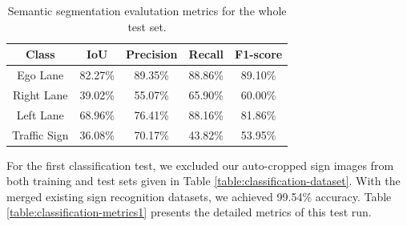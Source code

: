 \begin{table}[h]
  \begin{center}
    \caption{Semantic segmentation evalutation metrics for the whole test set.}
    \label{table:segmentation-metrics2}
    \begin{tabular}{|c|c|c|c|c|}
      \hline
      \textbf{Class} & \textbf{IoU} & \textbf{Precision} & \textbf{Recall} & \textbf{F1-score} \\
      \hline
      Ego Lane       & 82.27\%      & 89.35\%            & 88.86\%         & 89.10\% \\ 
      \hline
      Right Lane     & 39.02\%      & 55.07\%            & 65.90\%         & 60.00\% \\ 
      \hline
      Left Lane      & 68.96\%      & 76.41\%            & 88.16\%         & 81.86\% \\ 
      \hline
      Traffic Sign   & 36.08\%      & 70.17\%            & 43.82\%         & 53.95\% \\
      \hline
    \end{tabular}
  \end{center}
\end{table}

For the first classification test, we excluded our auto-cropped sign images
from both training and test sets given in Table
\ref{table:classification-dataset}.  With the merged existing sign recognition
datasets, we achieved 99.54\% accuracy.  Table
\ref{table:classification-metrics1} presents the detailed metrics of this test
run.


